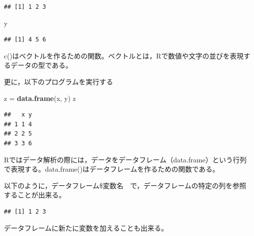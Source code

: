 \documentclass[]{article}
\newenvironment{Shaded}{\begin{snugshade}}{\end{snugshade}}
\newcommand{\KeywordTok}[1]{\textcolor[rgb]{0.13,0.29,0.53}{\textbf{#1}}}
\newcommand{\StringTok}[1]{\textcolor[rgb]{0.31,0.60,0.02}{#1}}
\newcommand{\OperatorTok}[1]{\textcolor[rgb]{0.81,0.36,0.00}{\textbf{#1}}}
\newcommand{\NormalTok}[1]{#1}
\begin{document}
\begin{verbatim}
## [1] 1 2 3
\end{verbatim}

\begin{Shaded}
\begin{Highlighting}[]
\NormalTok{y}
\end{Highlighting}
\end{Shaded}

\begin{verbatim}
## [1] 4 5 6
\end{verbatim}

c()はベクトルを作るための関数。ベクトルとは，Rで数値や文字の並びを表現するデータの型である。

更に，以下のプログラムを実行する

\begin{Shaded}
\begin{Highlighting}[]
\NormalTok{z =}\StringTok{ }\KeywordTok{data.frame}\NormalTok{(x, y) }
\NormalTok{z}
\end{Highlighting}
\end{Shaded}

\begin{verbatim}
##   x y
## 1 1 4
## 2 2 5
## 3 3 6
\end{verbatim}

Rではデータ解析の際には，データをデータフレーム（data.frame）という行列で表現する。data.frame()はデータフレームを作るための関数である。

以下のように，データフレーム\$変数名　で，データフレームの特定の列を参照することが出来る。

\begin{Shaded}
\end{Shaded}

\begin{verbatim}
## [1] 1 2 3
\end{verbatim}

データフレームに新たに変数を加えることも出来る。

\begin{Shaded}
\end{Shaded}
\end{document}
